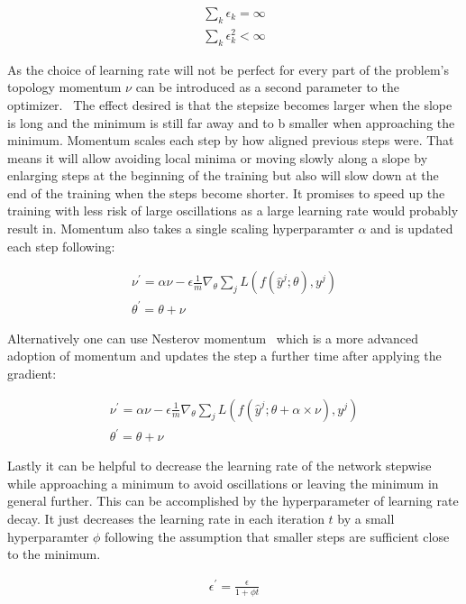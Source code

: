 \begin{align}
    \sum_k \epsilon_k = \infty\\
    \sum_k \epsilon_k^2 < \infty
\end{align}

As the choice of learning rate will not be perfect for every part of the problem's topology momentum $\nu$ can be introduced as a second parameter to the optimizer.~\cite{chollet2015keras} The effect desired is that the stepsize becomes larger when the slope is long and the minimum is still far away and to b smaller when approaching the minimum. Momentum scales each step by how aligned previous steps were. That means it will allow avoiding local minima or moving slowly along a slope by enlarging steps at the beginning of the training but also will slow down at the end of the training when the steps become shorter. It promises to speed up the training with less risk of large oscillations as a large learning rate would probably result in. Momentum also takes a single scaling hyperparamter $\alpha$ and is updated each step following: 

\begin{align}
    \nu^{\prime} = \alpha \nu - \epsilon \frac{1}{m} \nabla_{\theta} \sum_j L(f(\hat{y}^j; \theta), y^j)\\
    \theta^{\prime} = \theta + \nu
\end{align}

Alternatively one can use Nesterov momentum~\cite{chollet2015keras} which is a more advanced adoption of momentum and updates the step a further time after applying the gradient: 

\begin{align}
    \nu^{\prime} = \alpha \nu - \epsilon \frac{1}{m} \nabla_{\theta} \sum_j L(f(\hat{y}^j; \theta + \alpha \times \nu), y^j)\\
    \theta^{\prime} = \theta + \nu
\end{align}

Lastly it can be helpful to decrease the learning rate of the network stepwise while approaching a minimum to avoid oscillations or leaving the minimum in general further. This can be accomplished by the hyperparameter of learning rate decay. It just decreases the learning rate in each iteration $t$ by a small hyperparamter $\phi$ following the assumption that smaller steps are sufficient close to the minimum.~\cite{chollet2015keras}

\begin{align}
    \epsilon^{\prime} = \frac{\epsilon}{1 + \phi t}
\end{align}

